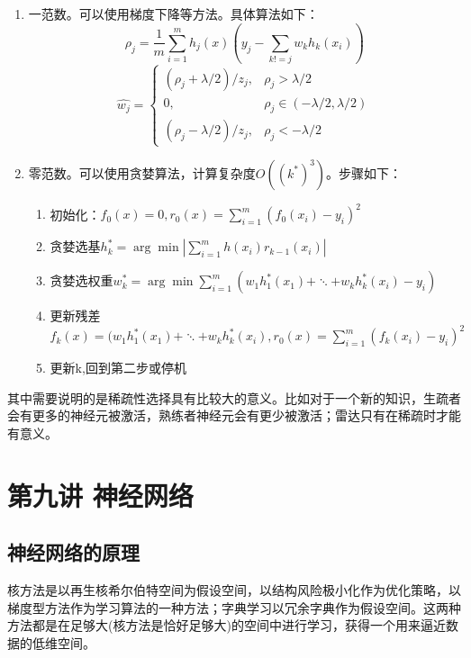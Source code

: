 \documentclass[10pt, a4paper]{article}
\begin{document}
\begin{enumerate}
\begin{enumerate}
$$\begin{array}{c}
			\mathcal{W}_{0} \\
			\mathcal{W}_{1} \\
			\mathcal{W}_{2} \\
			\vdots \\
			\mathcal{W}_{N}
		\end{array}\right)
		$$
		解析解：$$W_{2, \lambda}=\left(\mathrm{H}^{\prime} H+\lambda I\right)^{-1} X^{\mathrm{T}} Y$$
		\item 一范数。可以使用梯度下降等方法。具体算法如下：
		$$\rho_j=\frac{1}{m}\sum_{i=1}^{m}h_j(x)(y_j-\sum_{k!=j}w_kh_k(x_i))$$
		$$\hat{w_j}=\left\{\begin{array}{cc}
			(\rho_j+\lambda/2)/z_j, & \rho_j>\lambda/2\\
			0, & \rho_j \in \left(-\lambda/2,\lambda/2\right) \\
			(\rho_j-\lambda/2)/z_j, & \rho_j<-\lambda/2
		\end{array}\right.$$
		\item 零范数。可以使用贪婪算法，计算复杂度$O((k^*)^3)$。步骤如下：
		\begin{enumerate}
			\item 初始化：$f_0(x)=0,r_0(x)=\sum_{i=1}^{m}(f_0(x_i)-y_i)^2$
			\item 贪婪选基$h_k^*=\arg\min|\sum_{i=1}^{m}h(x_i)r_{k-1}(x_i)|$
			\item 贪婪选权重$w_k^*=\arg\min\sum_{i=1}^{m}(w_1h_1^*(x_1)+\ddots+w_kh_k^*(x_i)-y_i)$
			\item 更新残差$f_k(x)=(w_1h_1^*(x_1)+\ddots+w_kh_k^*(x_i),r_0(x)=\sum_{i=1}^{m}(f_k(x_i)-y_i)^2$
			\item 更新k,回到第二步或停机
		\end{enumerate}
	\end{enumerate}
\end{enumerate}

其中需要说明的是稀疏性选择具有比较大的意义。比如对于一个新的知识，生疏者会有更多的神经元被激活，熟练者神经元会有更少被激活；雷达只有在稀疏时才能有意义。

\section{第九讲 神经网络}
\subsection{神经网络的原理}

核方法是以再生核希尔伯特空间为假设空间，以结构风险极小化作为优化策略，以梯度型方法作为学习算法的一种方法；字典学习以冗余字典作为假设空间。这两种方法都是在足够大(核方法是恰好足够大)的空间中进行学习，获得一个用来逼近数据的低维空间。
\end{document}
